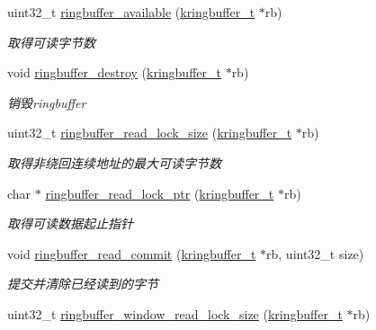 \begin{DoxyCompactItemize}
uint32\+\_\+t \hyperlink{a00087_aecd5c166ce42982ee434172cc555787d_aecd5c166ce42982ee434172cc555787d}{ringbuffer\+\_\+available} (\hyperlink{a00053_a66d91f7667db1f0b2983fc25e1a20f1c_a66d91f7667db1f0b2983fc25e1a20f1c}{kringbuffer\+\_\+t} $\ast$rb)
\begin{DoxyCompactList}\small\item\em 取得可读字节数 \end{DoxyCompactList}\item 
void \hyperlink{a00087_aa6135df0cc9bc827cae301626898dace_aa6135df0cc9bc827cae301626898dace}{ringbuffer\+\_\+destroy} (\hyperlink{a00053_a66d91f7667db1f0b2983fc25e1a20f1c_a66d91f7667db1f0b2983fc25e1a20f1c}{kringbuffer\+\_\+t} $\ast$rb)
\begin{DoxyCompactList}\small\item\em 销毁ringbuffer \end{DoxyCompactList}\item 
uint32\+\_\+t \hyperlink{a00087_a4bd33ec2ce3cba490a6166c5eac88f5c_a4bd33ec2ce3cba490a6166c5eac88f5c}{ringbuffer\+\_\+read\+\_\+lock\+\_\+size} (\hyperlink{a00053_a66d91f7667db1f0b2983fc25e1a20f1c_a66d91f7667db1f0b2983fc25e1a20f1c}{kringbuffer\+\_\+t} $\ast$rb)
\begin{DoxyCompactList}\small\item\em 取得非绕回连续地址的最大可读字节数 \end{DoxyCompactList}\item 
char $\ast$ \hyperlink{a00087_a51fd16b89396cbe6a3e4cf3d41b4dda5_a51fd16b89396cbe6a3e4cf3d41b4dda5}{ringbuffer\+\_\+read\+\_\+lock\+\_\+ptr} (\hyperlink{a00053_a66d91f7667db1f0b2983fc25e1a20f1c_a66d91f7667db1f0b2983fc25e1a20f1c}{kringbuffer\+\_\+t} $\ast$rb)
\begin{DoxyCompactList}\small\item\em 取得可读数据起止指针 \end{DoxyCompactList}\item 
void \hyperlink{a00087_a5d0caeccb61acafaa4c5148b697dd927_a5d0caeccb61acafaa4c5148b697dd927}{ringbuffer\+\_\+read\+\_\+commit} (\hyperlink{a00053_a66d91f7667db1f0b2983fc25e1a20f1c_a66d91f7667db1f0b2983fc25e1a20f1c}{kringbuffer\+\_\+t} $\ast$rb, uint32\+\_\+t size)
\begin{DoxyCompactList}\small\item\em 提交并清除已经读到的字节 \end{DoxyCompactList}\item 
uint32\+\_\+t \hyperlink{a00087_ae50358352ded17ea670e926a59250cd0_ae50358352ded17ea670e926a59250cd0}{ringbuffer\+\_\+window\+\_\+read\+\_\+lock\+\_\+size} (\hyperlink{a00053_a66d91f7667db1f0b2983fc25e1a20f1c_a66d91f7667db1f0b2983fc25e1a20f1c}{kringbuffer\+\_\+t} $\ast$rb)

\end{DoxyCompactItemize}
